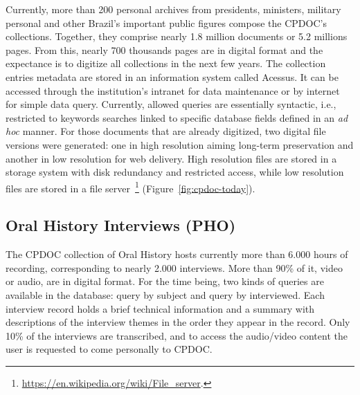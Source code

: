 Currently, more than 200 personal archives from presidents, ministers,
military personal and other Brazil's important public figures compose
the CPDOC's collections. Together, they comprise nearly 1.8 million
documents or 5.2 millions pages. From this, nearly 700 thousands pages
are in digital format and the expectance is to digitize all
collections in the next few years. The collection entries metadata are
stored in an information system called Acessus. It can be accessed
through the institution's intranet for data maintenance or by internet
for simple data query.
Currently, allowed queries are essentially syntactic, i.e.,
restricted to keywords searches linked to specific database fields
defined in an \emph{ad hoc} manner. For those documents that are
already digitized, two digital file versions were generated: one in
high resolution aiming long-term preservation and another in low
resolution for web delivery. High resolution files are stored in a
storage system with disk redundancy and restricted access, while low
resolution files are stored in a file
server~\footnote{\url{https://en.wikipedia.org/wiki/File_server}.}
(Figure~\ref{fig:cpdoc-today}).

\subsection{Oral History Interviews (PHO)}

The CPDOC collection of Oral History hosts currently more than 6.000
hours of recording, corresponding to nearly 2.000 interviews.  More
than 90\% of it, video or audio, are in digital format. For the time
being, two kinds of queries are available in the database: query by
subject and query by interviewed. Each interview record holds a brief
technical information and a summary with descriptions of the interview
themes in the order they appear in the record. Only 10\% of the
interviews are transcribed, and to access the audio/video content the
user is requested to come personally to CPDOC.

